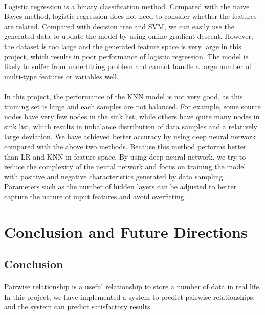 \documentclass[fleqn,11pt]{olplainarticle}
\begin{document}
\paragraph*{}
Logistic regression is a binary classification method. Compared with the naive Bayes method, logistic regression does not need to consider whether the features are related. Compared with decision tree and SVM, we can easily use the generated data to update the model by using online gradient descent. However, the dataset is too large and the generated feature space is very large in this project, which results in poor performance of logistic regression. The model is likely to suffer from underfitting problem and cannot handle a large number of multi-type features or variables well.
\paragraph*{}
In this project,  the performance of the KNN model is not very good, as this training set is large and each samples are not balanced. For example, some source nodes have very few nodes in the sink list, while others have quite many nodes in sink list, which results in imbalance distribution of data samples and a relatively large deviation. We have achieved better accuracy by using deep neural network compared with the above two methods. Because this method performs better than LR and KNN in feature space. By using deep neural network, we try to reduce the complexity of the neural network and focus on training the model with positive and negative characteristics generated by data sampling. Parameters such as the number of hidden layers can be adjusted to better capture the nature of input features and avoid overfitting. 


\section{Conclusion and Future Directions}\label{conclu}
\subsection{Conclusion}\label{con}
\paragraph*{}
Pairwise relationship is a useful relationship to store a number of data in real life. In this project, we have implemented a system to predict pairwise relationships, and the system can predict satisfactory results.
\end{document}
